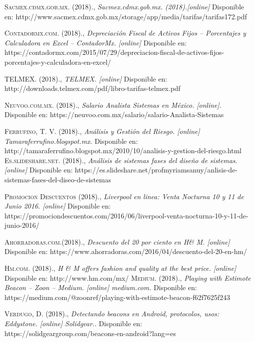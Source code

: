 \begin{thebibliography}{}
 \textsc{Sacmex.cdmx.gob.mx. (2018).}, 
\textit{ Sacmex.cdmx.gob.mx. (2018).[online]}
Disponible en: http://www.sacmex.cdmx.gob.mx/storage/app/media/tarifas/tarifas172.pdf

 \textsc{Contadormx.com. (2018).}, 
\textit{Depreciación Fiscal de Activos Fijos – Porcentajes y Calculadora en Excel – ContadorMx. [online] }
Disponible en: https://contadormx.com/2015/07/29/depreciacion-fiscal-de-activos-fijos-porcentajes-y-calculadora-en-excel/ 

 \textsc{TELMEX. (2018).}, 
\textit{TELMEX. [online] }
Disponible en: http://downloads.telmex.com/pdf/libro-tarifas-telmex.pdf 

 \textsc{Neuvoo.com.mx. (2018).}, 
\textit{Salario Analista Sistemas en México. [online].}
Disponible en: https://neuvoo.com.mx/salario/salario-Analista-Sistemas 

 \textsc{Ferrufino, T. V. (2018).}, 
\textit{Análisis y Gestión del Riesgo. [online] Tamaraferrufino.blogspot.mx. }
Disponible en: http://tamaraferrufino.blogspot.mx/2010/10/analisis-y-gestion-del-riesgo.html 
 \textsc{Es.slideshare.net. (2018).}, 
\textit{Análisis de sistemas fases del diseño de sistemas. [online] }
Disponible en: https://es.slideshare.net/profmyriamsanuy/anlisis-de-sistemas-fases-del-diseo-de-sistemas 

 \textsc{Promocion Descuentos (2018).}, 
\textit{Liverpool en linea: Venta Nocturna 10 y 11 de Junio 2016. [online] }
Disponible en: https://promociondescuentos.com/2016/06/liverpool-venta-nocturna-10-y-11-de-junio-2016/

 \textsc{Ahorradoras.com.(2018).}, 
\textit{Descuento del 20 por ciento en H\& M. [online] }
Disponible en: https://www.ahorradoras.com/2016/04/descuento-del-20-en-hm/ 

 \textsc{Hm.com. (2018).}, 
\textit{H \& M offers fashion and quality at the best price. [online] }
Disponible en: http://www.hm.com/mx/ 
 \textsc{Medium. (2018).}, 
\textit{Playing with Estimote Beacon – Zoon – Medium. [online] medium.com.}
Disponible en: https://medium.com/@zoonref/playing-with-estimote-beacon-f62f7625f243 

 \textsc{Verdugo, D. (2018).}, 
\textit{Detectando beacons en Android, protocolos, usos: Eddystone. [online] Solidgear..}
Disponible en: https://solidgeargroup.com/beacons-en-android?lang=es 


\end{thebibliography}
